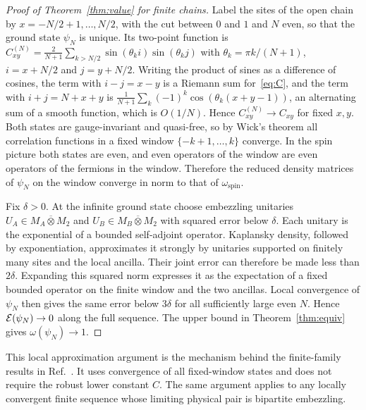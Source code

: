 \begin{proof}[Proof of Theorem~\ref{thm:value} for finite chains]
Label the sites of the open chain by $x=-N/2+1,\dots,N/2$, with the cut between $0$ and $1$ and
$N$ even, so that the ground state $\psi_N$ is unique. Its two-point function is
$C^{(N)}_{xy}=\tfrac{2}{N+1}\sum_{k>N/2}\sin(\theta_ki)\sin(\theta_kj)$ with
$\theta_k=\pi k/(N+1)$, $i=x+N/2$ and $j=y+N/2$. Writing the product of sines as a difference of
cosines, the term with $i-j=x-y$ is a Riemann sum for~\eqref{eq:C}, and the term with
$i+j=N+x+y$ is $\tfrac{1}{N+1}\sum_k(-1)^k\cos(\theta_k(x+y-1))$, an alternating sum of a smooth
function, which is $O(1/N)$. Hence $C^{(N)}_{xy}\to C_{xy}$ for fixed $x,y$. Both states are
gauge-invariant and quasi-free, so by Wick's theorem all correlation functions in a fixed window
$\{-k+1,\dots,k\}$ converge. In the spin picture both states are even, and even operators of the
window are even operators of the fermions in the window. Therefore the reduced density matrices
of $\psi_N$ on the window converge in norm to that of $\omega_{\mathrm{spin}}$.

Fix $\delta>0$. At the infinite ground state choose embezzling unitaries
$U_A\in M_A\overline\otimes M_2$ and
$U_B\in M_B\overline\otimes M_2$ with squared error below $\delta$.
Each unitary is the exponential of a bounded self-adjoint operator.
Kaplansky density, followed by exponentiation, approximates it strongly by
unitaries supported on finitely many sites and the local ancilla. Their
joint error can therefore be made less than $2\delta$. Expanding this squared
norm expresses it as the expectation of a fixed bounded operator on the
finite window and the two ancillas. Local convergence of $\psi_N$ then gives
the same error below $3\delta$ for all sufficiently large even $N$.
Hence $\mathcal{E}(\psi_N)\to0$ along the full sequence. The upper bound in
Theorem~\ref{thm:equiv} gives $\omega(\psi_N)\to1$.
\end{proof}

This local approximation argument is the mechanism behind the finite-family
results in Ref.~\cite{vLSW25}. It uses convergence of all fixed-window states
and does not require the robust lower constant $C$. The same argument applies
to any locally convergent finite sequence whose limiting physical pair is
bipartite embezzling.
